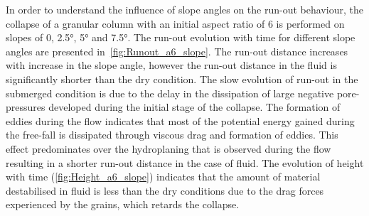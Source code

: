 In order to understand the influence of slope angles on the run-out behaviour, 
the collapse of a granular column with an initial aspect ratio of 6 is 
performed on slopes of 0, 2.5\si{\degree}, 5\si{\degree} and 7.5\si{\degree}. 
The run-out evolution with time for different slope angles are presented 
in~\cref{fig:Runout_a6_slope}. The run-out distance increases with increase 
in the slope angle, however the run-out distance in the fluid is significantly 
shorter than the dry condition. The slow evolution of run-out in the submerged 
condition is due to the delay in the dissipation of large negative 
pore-pressures developed during the initial stage of the collapse. The 
formation of eddies during the flow indicates that most of the potential energy 
gained during the free-fall is dissipated through viscous drag and formation of 
eddies. This effect predominates over the hydroplaning that is observed during 
the flow resulting in a shorter run-out distance in the case of fluid. The 
evolution of height with time (\cref{fig:Height_a6_slope}) indicates that the 
amount of material destabilised in fluid is less than the dry conditions due to 
the drag forces experienced by the grains, which retards the collapse.

